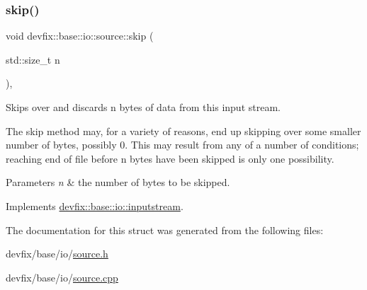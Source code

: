 \subsubsection{\texorpdfstring{skip()}{skip()}}
{\footnotesize\ttfamily void devfix\+::base\+::io\+::source\+::skip (\begin{DoxyParamCaption}\item[{std\+::size\+\_\+t}]{n }\end{DoxyParamCaption})\hspace{0.3cm}{\ttfamily [override]}, {\ttfamily [virtual]}}



Skips over and discards n bytes of data from this input stream. 

The skip method may, for a variety of reasons, end up skipping over some smaller number of bytes, possibly 0. This may result from any of a number of conditions; reaching end of file before n bytes have been skipped is only one possibility.


\begin{DoxyParams}{Parameters}
{\em n} & the number of bytes to be skipped. \\
\hline
\end{DoxyParams}


Implements \hyperlink{structdevfix_1_1base_1_1io_1_1inputstream_a1868a733fd646b29daae6874e07e4e03}{devfix\+::base\+::io\+::inputstream}.



The documentation for this struct was generated from the following files\+:\begin{DoxyCompactItemize}
\item 
devfix/base/io/\hyperlink{source_8h}{source.\+h}\item 
devfix/base/io/\hyperlink{source_8cpp}{source.\+cpp}\end{DoxyCompactItemize}
